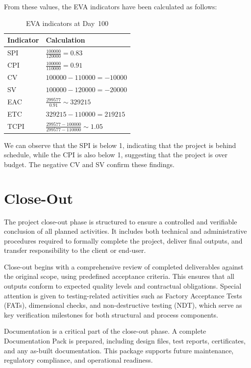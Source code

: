 From these values, the EVA indicators have been calculated as follows:

\def\arraystretch{1.5}
\begin{table}[ht]
  \centering
  \begin{tabular}{|l|l|}
    \hline
    \textbf{Indicator} & \textbf{Calculation}\\
    \hline
    SPI   & $\frac{100000}{120000} = 0.83$ \\
    \hline
    CPI   & $\frac{100000}{110000} = 0.91$ \\
    \hline
    CV    & $100000 - 110000 = -10000$ \\
    \hline
    SV    & $100000 - 120000 = -20000$ \\
    \hline
    EAC   & $\frac{299577}{0.91} \sim 329215$ \\
    \hline
    ETC   & $329215 - 110000 = 219215$ \\
    \hline
    TCPI  & $\frac{299577 - 100000}{299577 - 110000}  \sim 1.05$ \\
    \hline
  \end{tabular}
  \caption{EVA indicators at Day~100}
\end{table}


We can observe that the SPI is below 1, indicating that the project is behind schedule, while the CPI is also below 1, suggesting that the project is over budget. The negative CV and SV confirm these findings.

\section{Close-Out}

The project close-out phase is structured to ensure a controlled and verifiable conclusion of all planned activities. It includes both technical and administrative procedures required to formally complete the project, deliver final outputs, and transfer responsibility to the client or end-user.

Close-out begins with a comprehensive review of completed deliverables against the original scope, using predefined acceptance criteria. This ensures that all outputs conform to expected quality levels and contractual obligations. Special attention is given to testing-related activities such as Factory Acceptance Tests (FATs), dimensional checks, and non-destructive testing (NDT), which serve as key verification milestones for both structural and process components.

Documentation is a critical part of the close-out phase. A complete Documentation Pack is prepared, including design files, test reports, certificates, and any as-built documentation. This package supports future maintenance, regulatory compliance, and operational readiness.

